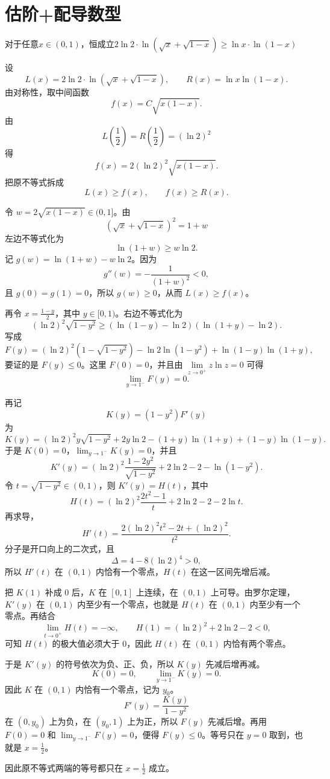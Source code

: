 \section{估阶+配导数型}
\begin{example}
    对于任意$x\in(0,1)$，恒成立$2\ln 2 \cdot \ln(\sqrt{x}+\sqrt{1-x}) \geq \ln x \cdot \ln(1-x)$
\end{example}
\begin{solution}
设
\[
L(x)=2\ln 2 \cdot \ln(\sqrt{x}+\sqrt{1-x}),\qquad R(x)=\ln x\ln(1-x).
\]
由对称性，取中间函数
\[
f(x) = C \sqrt{x(1-x)}.
\]
由
\[
L\left(\frac12\right)=R\left(\frac12\right)=(\ln2)^2
\]
得
\[
f(x) = 2(\ln 2)^2 \sqrt{x(1-x)}.
\]
把原不等式拆成
\[
L(x)\ge f(x),\qquad f(x)\ge R(x).
\]

令 \(w = 2\sqrt{x(1-x)}\in(0,1]\)。由
\[
(\sqrt{x}+\sqrt{1-x})^2 = 1 + w
\]
左边不等式化为
\[
\ln(1+w)\ge w\ln 2.
\]
记 \(g(w)=\ln(1+w)-w\ln2\)。因为
\[
g''(w)=-\frac{1}{(1+w)^2}<0,
\]
且 \(g(0)=g(1)=0\)，所以 \(g(w)\ge0\)，从而 \(L(x)\ge f(x)\)。

再令 \(x=\frac{1-y}{2}\)，其中 \(y\in[0,1)\)。右边不等式化为
$$ (\ln 2)^2 \sqrt{1-y^2} \geq (\ln(1-y)-\ln 2)(\ln(1+y)-\ln 2). $$
写成
$$ F(y) = (\ln 2)^2(1 - \sqrt{1-y^2}) - \ln 2 \ln(1-y^2) + \ln(1-y)\ln(1+y), $$
要证的是 \(F(y)\le0\)。这里 \(F(0)=0\)，并且由 \(\lim\limits_{z \to 0^+} z\ln z = 0\) 可得
\[
\lim_{y \to 1^-} F(y)=0.
\]

再记
\[
K(y)=(1-y^2)F'(y)
\]
为
$$ K(y) = (\ln 2)^2 y \sqrt{1-y^2} + 2y \ln 2 - (1+y)\ln(1+y) + (1-y)\ln(1-y). $$
于是 \(K(0)=0\)，\(\lim_{y\to1^-}K(y)=0\)，并且
$$ K'(y) = (\ln 2)^2 \frac{1-2y^2}{\sqrt{1-y^2}} + 2\ln 2 - 2 - \ln(1-y^2). $$
令 \(t=\sqrt{1-y^2}\in(0,1)\)，则 \(K'(y)=H(t)\)，其中
$$ H(t) = (\ln 2)^2 \frac{2t^2-1}{t} + 2\ln 2 - 2 - 2\ln t. $$
再求导，
$$ H'(t) = \frac{2(\ln 2)^2 t^2 - 2t + (\ln 2)^2}{t^2}. $$
分子是开口向上的二次式，且
\[
\Delta = 4 - 8(\ln 2)^4 > 0,
\]
所以 \(H'(t)\) 在 \((0,1)\) 内恰有一个零点，\(H(t)\) 在这一区间先增后减。

把 \(K(1)\) 补成 \(0\) 后，\(K\) 在 \([0,1]\) 上连续，在 \((0,1)\) 上可导。由罗尔定理，\(K'(y)\) 在 \((0,1)\) 内至少有一个零点，也就是 \(H(t)\) 在 \((0,1)\) 内至少有一个零点。再结合
\[
\lim_{t \to 0^+} H(t) = -\infty,\qquad H(1) = (\ln 2)^2 + 2\ln 2 - 2 < 0,
\]
可知 \(H(t)\) 的极大值必须大于 \(0\)，因此 \(H(t)\) 在 \((0,1)\) 内恰有两个零点。

于是 \(K'(y)\) 的符号依次为负、正、负，所以 \(K(y)\) 先减后增再减。
\[
K(0)=0,\qquad \lim_{y\to1^-}K(y)=0.
\]
因此 \(K\) 在 \((0,1)\) 内恰有一个零点，记为 \(y_0\)。
\[
F'(y)=\frac{K(y)}{1-y^2}
\]
在 \((0,y_0)\) 上为负，在 \((y_0,1)\) 上为正，所以 \(F(y)\) 先减后增。再用 \(F(0)=0\) 和 \(\lim_{y\to1^-}F(y)=0\)，便得 \(F(y)\le0\)。等号只在 \(y=0\) 取到，也就是 \(x=\frac12\)。

因此原不等式两端的等号都只在 \(x=\frac12\) 成立。
\end{solution}


